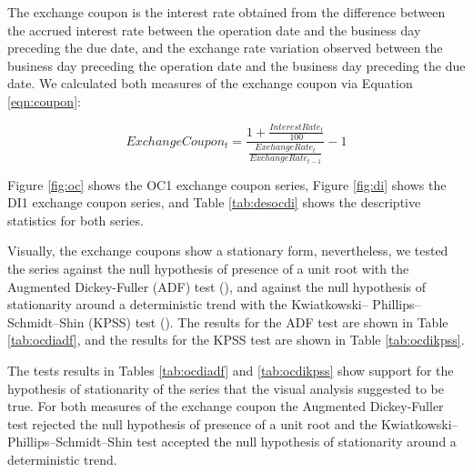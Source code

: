 \documentclass[cic,tc, english]{iiufrgs}
\begin{document}
    

    

    

    The exchange coupon is the interest rate obtained from the difference between the accrued interest rate between the operation date and the business day preceding the due date, and the exchange rate variation observed between the business day preceding the operation date and the business day preceding the due date. We calculated both measures of the exchange coupon via Equation \ref{eqn:coupon}:

    \begin{equation}
        \label{eqn:coupon}
        ExchangeCoupon_t = \frac{1 + \frac{InterestRate_t}{100}}{\frac{ExchangeRate_t}{ExchangeRate_{t-1}}} - 1
    \end{equation}

    Figure \ref{fig:oc} shows the OC1 exchange coupon series, Figure \ref{fig:di} shows the DI1 exchange coupon series, and Table \ref{tab:desocdi} shows the descriptive statistics for both series.

    

    

    

    Visually, the exchange coupons show a stationary form, nevertheless, we tested the series against the null hypothesis of presence of a unit root with the Augmented Dickey-Fuller (ADF) test (\citet{adf}), and against the null hypothesis of stationarity around a deterministic trend with the Kwiatkowski– Phillips–Schmidt–Shin (KPSS) test (\citet{kpss}). The results for the ADF test are shown in Table \ref{tab:ocdiadf}, and the results for the KPSS test are shown in Table \ref{tab:ocdikpss}.

    

    

    The tests results in Tables \ref{tab:ocdiadf} and \ref{tab:ocdikpss} show support for the hypothesis of stationarity of the series that the visual analysis suggested to be true. For both measures of the exchange coupon the Augmented Dickey-Fuller test rejected the null hypothesis of presence of a unit root and the Kwiatkowski– Phillips–Schmidt–Shin test accepted the null hypothesis of stationarity around a deterministic trend.
    
\end{document}
